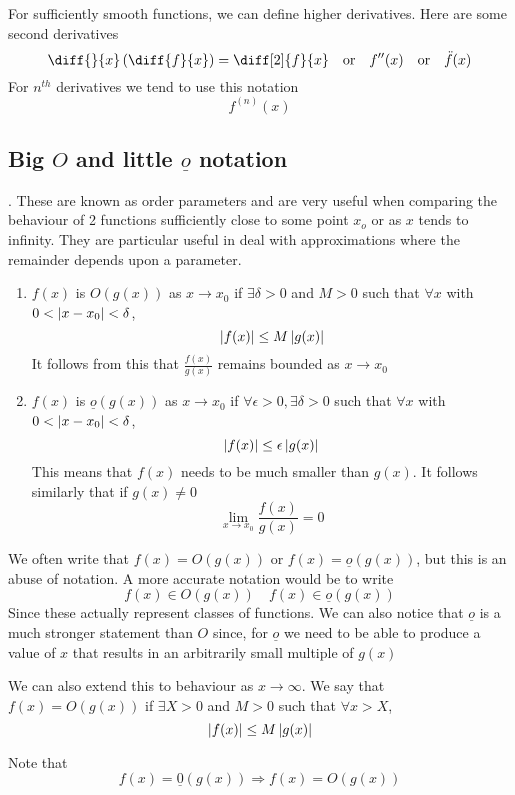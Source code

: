 \documentclass{article}
\begin{document}
For sufficiently smooth functions, we can define higher derivatives. Here are some second derivatives
\[
    \diff{}{x}\left(\diff{f}{x}\right) = \diff[2]{f}{x} \quad \text{or} \quad f^{\prime\prime}(x) \quad \text{or} \quad \ddot{f}(x)
\]
For $n^{th}$ derivatives we tend to use this notation
\[
    f^{(n)}(x)
\]

\subsection{Big $O$ and little $\underline{o}$ notation}.
These are known as order parameters and are very useful when comparing the behaviour of 2 functions sufficiently close to some point $x_o$ or as $x$ tends to infinity. They are particular useful in deal with approximations where the remainder depends upon a parameter.

\begin{defi}\leavevmode
    \begin{enumerate}
        \item $f(x)$ is $O(g(x))$ as $x \rightarrow x_0$ if $\exists \delta > 0$ and $M > 0$ such that $\forall x$ with $0 < \left\lvert x - x_0\right\rvert < \delta$,
        \[
            \left\lvert f(x)\right\rvert \leq M\left\lvert g(x)\right\rvert  
        \]
        It follows from this that $\frac{f(x)}{g(x)}$ remains bounded as $x \rightarrow x_0$
        \item $f(x)$ is $\underline{o}(g(x))$ as $x \rightarrow x_0$ if $\forall \epsilon > 0, \exists \delta > 0$ such that $\forall x$ with $0 < \left\lvert x - x_0\right\rvert < \delta$,
        \[
            \left\lvert f(x)\right\rvert \leq \epsilon\left\lvert g(x)\right\rvert  
        \]
        This means that $f(x)$ needs to be much smaller than $g(x)$. It follows similarly that if $g(x) \neq 0 $
        \[
            \lim_{x \rightarrow x_0}{\frac{f(x)}{g(x)}} = 0  
        \]
    \end{enumerate}
    We often write that $f(x) = O(g(x))$ or $f(x) = \underline{o}(g(x))$, but this is an abuse of notation. A more accurate notation would be to write
    \[
        f(x) \in O(g(x)) \quad f(x) \in \underline{o}(g(x))
    \]
    Since these actually represent classes of functions. We can also notice that $\underline{o}$ is a much stronger statement than $O$ since, for $\underline{o}$ we need to be able to produce a value of $x$ that results in an arbitrarily small multiple of $g(x)$

    We can also extend this to behaviour as $x \rightarrow \infty$. We say that $f(x) = O(g(x))$ if $\exists X > 0$ and $M > 0$ such that $\forall x > X$,
    \[
        \left\lvert f(x)\right\rvert \leq M\left\lvert g(x)\right\rvert  
    \]

    Note that
    \[
        f(x) = \underline{0}(g(x)) \Rightarrow f(x) = O(g(x))  
    \]
\end{defi}
\end{document}
